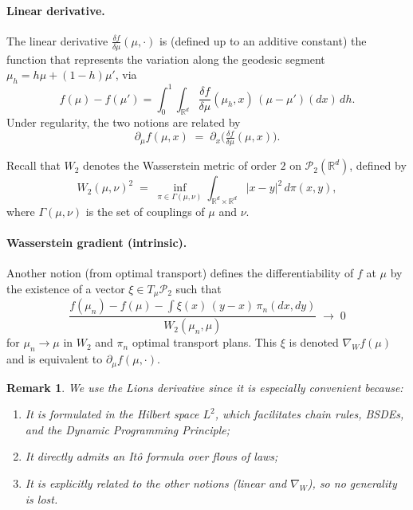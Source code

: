 \documentclass[12pt]{article}
\newtheorem*{obs*}{Remark}
\theoremstyle{definition}
\begin{document}
\paragraph{Linear derivative.}
The linear derivative $\frac{\delta f}{\delta\mu}(\mu,\cdot)$ is (defined up to an additive constant) the function that represents the variation along the geodesic segment $\mu_h=h\mu+(1-h)\mu'$, via
\[
f(\mu)-f(\mu')=\int_0^1\int_{\mathbb{R}^d}\frac{\delta f}{\delta\mu}(\mu_h,x)\,(\mu-\mu')(dx)\,dh.
\]
Under regularity, the two notions are related by
\[
\partial_\mu f(\mu,x)\;=\;\partial_x\Big(\tfrac{\delta f}{\delta\mu}(\mu,x)\Big).
\]

Recall that $W_2$ denotes the Wasserstein metric of order $2$ on $\mathcal{P}_2(\mathbb{R}^d)$, defined by
\[
W_2(\mu,\nu)^2 \;=\; \inf_{\pi \in \Gamma(\mu,\nu)} \int_{\mathbb{R}^d\times \mathbb{R}^d} |x-y|^2 \, d\pi(x,y),
\]
where $\Gamma(\mu,\nu)$ is the set of couplings of $\mu$ and $\nu$.

\paragraph{Wasserstein gradient (intrinsic).}
Another notion (from optimal transport) defines the differentiability of $f$ at $\mu$ by the existence of a vector $\xi\in T_\mu\mathcal{P}_2$ such that
\[
\frac{f(\mu_n)-f(\mu)-\int \xi(x)\,(y-x)\,\pi_n(dx,dy)}{W_2(\mu_n,\mu)}\;\to\;0
\]
for $\mu_n\to\mu$ in $W_2$ and $\pi_n$ optimal transport plans. This $\xi$ is denoted $\nabla_W f(\mu)$ and is equivalent to $\partial_\mu f(\mu,\cdot)$.

\begin{obs*}
We use the Lions derivative since it is especially convenient because:
\begin{enumerate}
    \item It is formulated in the Hilbert space $L^2$, which facilitates chain rules, BSDEs, and the Dynamic Programming Principle;
    \item It directly admits an It\^{o} formula over flows of laws;
    \item It is explicitly related to the other notions (linear and $\nabla_W$), so no generality is lost.
\end{enumerate}
\end{obs*}
\end{document}
